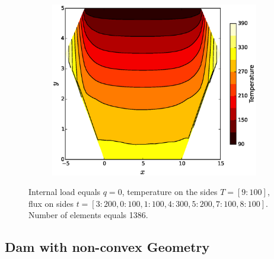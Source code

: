 \documentclass[10pt, a4paper]{article}
\begin{document}
\begin{figure}[H]
\begin{subfigure}[H]{0.33\textwidth}
	\end{subfigure}
	\begin{subfigure}[H]{0.33\textwidth}
		\includegraphics[width=\textwidth]{fig/test5_3.eps}
		\caption{}
		\label{fig:3}
	\end{subfigure}
	\caption{Internal load equals $q=0$, temperature on the sides $T=[9:100]$, flux on sides $t=[3:200, 0:100, 1:100, 4:300, 5:200, 7:100, 8:100]$. Number of elements equals 1386.}
	\label{fig:3_1}
\end{figure}

\subsection{Dam with non-convex Geometry}
\end{document}
